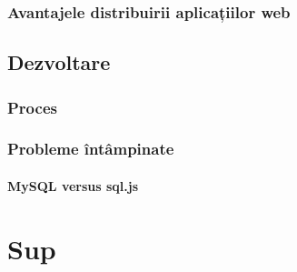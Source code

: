 \documentclass[12pt, a4paper, oneside, romanian]{teza-upb}
\begin{document}
    \subsection{Avantajele distribuirii aplicațiilor web}

  \section{Dezvoltare}

    \subsection{Proces}

    \subsection{Probleme întâmpinate}
      \subsubsection{MySQL versus sql.js} %
      \label{ssub:MySQL versus sql.js}




\appendix
\chapter {Sup}
\end{document}
